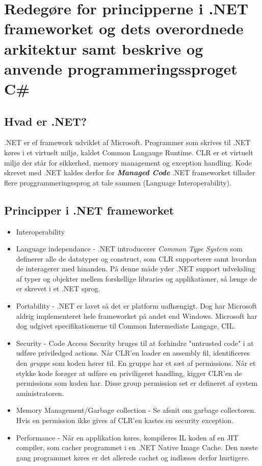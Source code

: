 \section{Redegøre for principperne i .NET frameworket og dets overordnede arkitektur samt beskrive og anvende programmeringssproget C\#}\label{sec:spm1}

\subsection{Hvad er .NET?}

.NET er ef framework udviklet af Microsoft. Programmer som skrives til .NET køres i et virtuelt miljø, kaldet Common Langauge Runtime. CLR er et virtuelt miljø der står for sikkerhed, memory management og exception handling. Kode skrevet med .NET kaldes derfor for \textbf{\textit{Managed Code}} .NET frameworket tillader flere proggrammeringssprog at tale sammen (Language Interoperability).


\subsection{Principper i .NET frameworket}

\begin{itemize}
	\item Interoperability
	\item Language independance - .NET introducerer \textit{Common Type System} som definerer alle de datatyper og construct, som CLR supporterer samt hvordan de interagerer med hinanden. På denne måde yder .NET support udveksling af typer og objekter mellem forskellige libraries og applikationer, så længe de er skrevet i et .NET sprog. 
	\item Portability - .NET er lavet så det er platform uafhængigt. Dog har Microsoft aldrig implementeret hele frameworket på andet end Windows. Microsoft har dog udgivet specifikationerne til Common Intermediate Langage, CIL.
	\item Security - Code Access Security bruges til at forhindre "untrusted code" i at udføre priviledged actions. Når CLR'en loader en assembly fil, identificeres den \textit{gruppe} som koden hører til. En gruppe har et sæt af permissions. Når et stykke kode forøger at udføre en priviligeret handling, kigger CLR'en de permissions som koden har. Disse group permission set er defineret af system aministratoren.
	\item Memory Management/Garbage collection - Se afsnit om garbage collectoren. Hvis en permission ikke gives af CLR'en kastes en security exception.
	\item Performance - Når en applikation køres, kompileres IL koden af en JIT compiler, som cacher programmet i en .NET Native Image Cache. Den næste gang programmet køres er det allerede cachet og indlæses derfor hurtigere.
\end{itemize}

